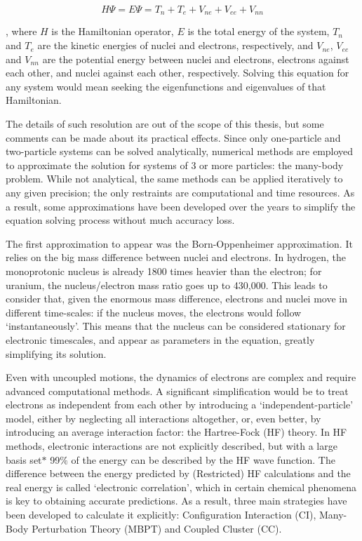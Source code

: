  \[ H \Psi =E \Psi =T_{n}+T_{e}+V_{ne}+V_{ee}+V_{nn} \]

, where $H$ is the Hamiltonian operator, $E$ is the total energy of the system, $T_{n}$ and $T_{e}$ are the kinetic energies of nuclei and electrons, respectively, and $V_{ne}$, $V_{ee}$ and $V_{nn}$ are the potential energy between nuclei and electrons, electrons against each other, and nuclei against each other, respectively. Solving this equation for any system would mean seeking the eigenfunctions and eigenvalues of that Hamiltonian.

The details of such resolution are out of the scope of this thesis, but some comments can be made about its practical effects. Since only one-particle and two-particle systems can be solved analytically, numerical methods are employed to approximate the solution for systems of 3 or more particles: the many-body problem. While not analytical, the same methods can be applied iteratively to any given precision; the only restraints are computational and time resources. As a result, some approximations have been developed over the years to simplify the equation solving process without much accuracy loss.

The first approximation to appear was the Born-Oppenheimer approximation. It relies on the big mass difference between nuclei and electrons. In hydrogen, the monoprotonic nucleus is already 1800 times heavier than the electron; for uranium, the nucleus/electron mass ratio goes up to 430,000. This leads to consider that, given the enormous mass difference, electrons and nuclei move in different time-scales: if the nucleus moves, the electrons would follow ‘instantaneously’. This means that the nucleus can be considered stationary for electronic timescales, and appear as parameters in the equation, greatly simplifying its solution.

Even with uncoupled motions, the dynamics of electrons are complex and require advanced computational methods. A significant simplification would be to treat electrons as independent from each other by introducing a ‘independent-particle’ model, either by neglecting all interactions altogether, or, even better, by introducing an average interaction factor: the Hartree-Fock (HF) theory. In HF methods, electronic interactions are not explicitly described, but with a large basis set$\ast$  99$\%$  of the energy can be described by the HF wave function. The difference between the energy predicted by (Restricted) HF calculations and the real energy is called ‘electronic correlation’, which in certain chemical phenomena is key to obtaining accurate predictions. As a result, three main strategies have been developed to calculate it explicitly: Configuration Interaction (CI), Many-Body Perturbation Theory (MBPT) and Coupled Cluster (CC).

